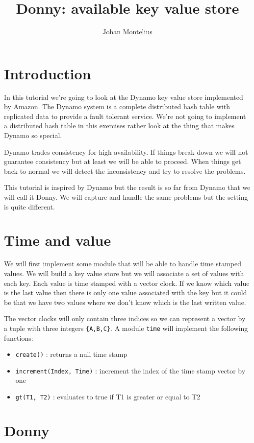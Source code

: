 \documentclass[a4paper,11pt]{article}
\author{Johan Montelius}
\title{Donny: available key value store}
\newcommand{\nnsection}[1]{
\section*{#1}
\addcontentsline{toc}{section}{#1}
}
\begin{document}
\maketitle

\nnsection{Introduction}

In this tutorial we're going to look at the Dynamo key value store
implemented by Amazon. The Dynamo system is a complete distributed
hash table with replicated data to provide a fault tolerant
service. We're not going to implement a distributed hash table in this
exercises rather look at the thing that makes Dynamo so special.

Dynamo trades consistency for high availability. If things break down
we will not guarantee consistency but at least we will be able to
proceed. When things get back to normal we will detect the
inconsistency and try to resolve the problems. 

This tutorial is inspired by Dynamo but the result is so
far from Dynamo that we will call it Donny. We will capture and handle
the same problems but the setting is quite different.


\section{Time and value}

We will first implement some module that will be able to handle time
stamped values. We will build a key value store but we will associate
a set of values with each key. Each value is time stamped with a
vector clock. If we know which value is the last value then there is
only one value associated with the key but it could be that we have
two values where we don't know which is the last written value.

The vector clocks will only contain three indices so we can represent a
vector by a tuple with three integers {\tt \{A,B,C\}}. A module {\tt time}
will implement the following functions:

\begin{itemize}
\item {\tt create()} : returns a null time stamp
\item {\tt increment(Index, Time)} : increment the index of the time stamp vector by one
\item {\tt gt(T1, T2)} : evaluates to true if T1 is greater or equal to T2
\end{itemize}




\section{Donny}
\end{document}
